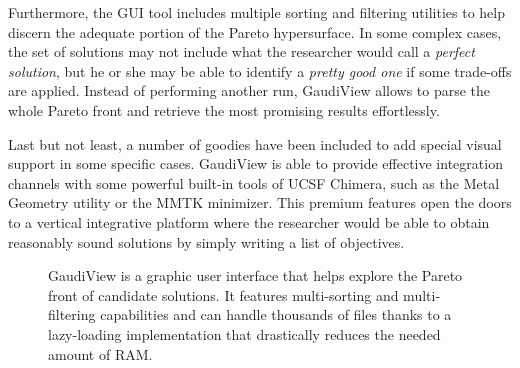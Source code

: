 Furthermore, the GUI tool includes multiple sorting and filtering utilities to help discern the adequate portion of the Pareto hypersurface. In some complex cases, the set of solutions may not include what the researcher would call a \emph{perfect solution}, but he or she may be able to identify a \emph{pretty good one} if some trade-offs are applied. Instead of performing another run, GaudiView allows to parse the whole Pareto front and retrieve the most promising results effortlessly.

Last but not least, a number of goodies have been included to add special visual support in some specific cases. GaudiView is able to provide effective integration channels with some powerful built-in tools of UCSF Chimera, such as the Metal Geometry utility or the MMTK minimizer. This premium features open the doors to a vertical integrative platform where the researcher would be able to obtain reasonably sound solutions by simply writing a list of objectives.
\begin{figure}
\noindent{}
\caption{GaudiView is a graphic user interface that helps explore the Pareto front of candidate solutions. It features multi-sorting and multi-filtering capabilities and can handle thousands of files thanks to a lazy-loading implementation that drastically reduces the needed amount of RAM.}
\end{figure}



% 

% 



